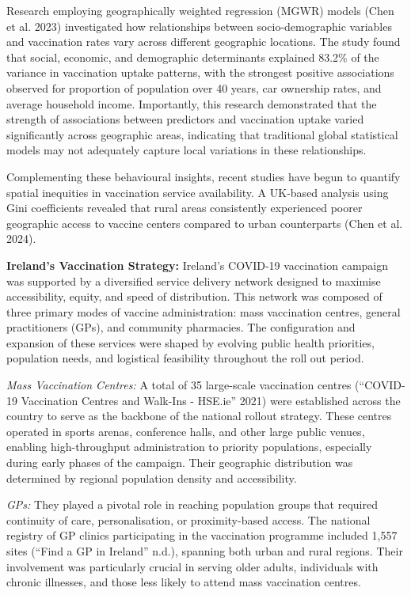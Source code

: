 \documentclass{article}
\begin{document}
Research employing geographically weighted regression (MGWR) models
(Chen et al. 2023) investigated how relationships between
socio-demographic variables and vaccination rates vary across different
geographic locations. The study found that social, economic, and
demographic determinants explained 83.2\% of the variance in vaccination
uptake patterns, with the strongest positive associations observed for
proportion of population over 40 years, car ownership rates, and average
household income. Importantly, this research demonstrated that the
strength of associations between predictors and vaccination uptake
varied significantly across geographic areas, indicating that
traditional global statistical models may not adequately capture local
variations in these relationships.

Complementing these behavioural insights, recent studies have begun to
quantify spatial inequities in vaccination service availability. A
UK-based analysis using Gini coefficients revealed that rural areas
consistently experienced poorer geographic access to vaccine centers
compared to urban counterparts (Chen et al. 2024).

\textbf{Ireland's Vaccination Strategy:} Ireland's COVID-19 vaccination
campaign was supported by a diversified service delivery network
designed to maximise accessibility, equity, and speed of distribution.
This network was composed of three primary modes of vaccine
administration: mass vaccination centres, general practitioners (GPs),
and community pharmacies. The configuration and expansion of these
services were shaped by evolving public health priorities, population
needs, and logistical feasibility throughout the roll out period.

\emph{Mass Vaccination Centres:} A total of 35 large-scale vaccination
centres ({``{COVID}-19 Vaccination Centres and Walk-Ins - {HSE}.ie''}
2021) were established across the country to serve as the backbone of
the national rollout strategy. These centres operated in sports arenas,
conference halls, and other large public venues, enabling
high-throughput administration to priority populations, especially
during early phases of the campaign. Their geographic distribution was
determined by regional population density and accessibility.

\emph{GPs:} They played a pivotal role in reaching population groups
that required continuity of care, personalisation, or proximity-based
access. The national registry of GP clinics participating in the
vaccination programme included 1,557 sites ({``Find a {GP} in
{Ireland}''} n.d.), spanning both urban and rural regions. Their
involvement was particularly crucial in serving older adults,
individuals with chronic illnesses, and those less likely to attend mass
vaccination centres.
\end{document}
